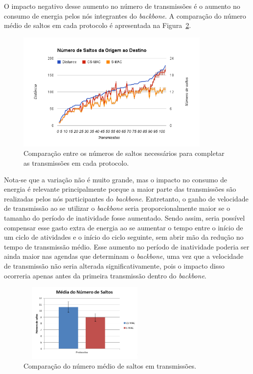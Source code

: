 O impacto negativo desse aumento no número de transmissões é o aumento no consumo de energia pelos nós integrantes do \emph{backbone}. A comparação do número médio de saltos em cada protocolo é apresentada na Figura~\ref{fig:averageNumberOfHops}. 

\begin{figure}[!htb]
\centering
\includegraphics[width=360px,height=223px]{./Pictures/NumberOfHopsComparison.png}
\caption{Comparação entre os números de saltos necessários para completar as transmissões em cada protocolo.} %
\label{fig:numberOfHopsComparison} %
\end{figure}

Nota-se que a variação não é muito grande, mas o impacto no consumo de energia é relevante principalmente porque a maior parte das transmissões são realizadas pelos nós participantes do \emph{backbone}.  Entretanto, o ganho de velocidade de transmissão ao se utilizar o \emph{backbone} seria proporcionalmente maior se o tamanho do período de inatividade fosse aumentado. Sendo assim, seria possível compensar esse gasto extra de energia ao se aumentar o tempo entre o início de um ciclo de atividades e o início do ciclo seguinte, sem abrir mão da redução no tempo de transmissão médio. Esse aumento no período de inatividade poderia ser ainda maior nas agendas que determinam o \emph{backbone}, uma vez que a velocidade de transmissão não seria alterada significativamente, pois o impacto disso ocorreria apenas antes da primeira transmissão dentro do \emph{backbone}.

\begin{figure}[!htb]
\centering
\includegraphics[width=250px,height=146px]{./Pictures/AverageNumberOfHops.png}
\caption{Comparação do número médio de saltos em transmissões.} %
\label{fig:averageNumberOfHops} %
\end{figure}